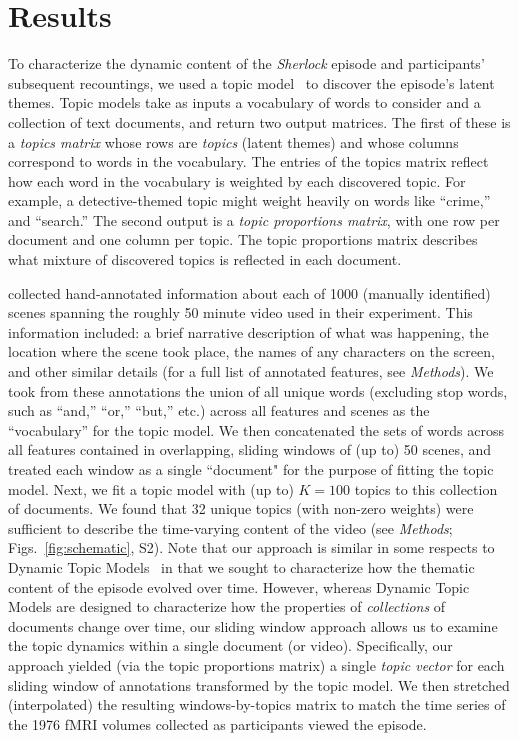 \documentclass{article}
\newcommand{\topics}{S2}
\begin{document}
\section*{Results}
To characterize the dynamic content of the \textit{Sherlock} episode and participants' subsequent recountings, we used a topic model~\citep{BleiEtal03} to discover the episode's latent themes.  Topic models take as inputs a vocabulary of words to consider and a collection of text documents, and return two output matrices.  The first of these is a \textit{topics matrix} whose rows are \textit{topics} (latent themes) and whose columns correspond to words in the vocabulary. The entries of the topics matrix reflect how each word in the vocabulary is weighted by each discovered topic.  For example, a detective-themed topic might weight heavily on words like ``crime,'' and ``search.''  The second output is a \textit{topic proportions matrix}, with one row per document and one column per topic.  The topic proportions matrix describes what mixture of discovered topics is reflected in each document.

\cite{ChenEtal17} collected hand-annotated information about each of 1000 (manually identified) scenes spanning the roughly 50 minute video used in their experiment.  This information included: a brief narrative description of what was happening, the location where the scene took place, the names of any characters on the screen, and other similar details (for a full list of annotated features, see \textit{Methods}).  We took from these annotations the union of all unique words (excluding stop words, such as ``and,'' ``or,'' ``but,'' etc.) across all features and scenes as the ``vocabulary'' for the topic model.  We then concatenated the sets of words across all features contained in overlapping, sliding windows of (up to) 50 scenes, and treated each window as a single ``document" for the purpose of fitting the topic model.  Next, we fit a topic model with (up to) $K = 100$ topics to this collection of documents.  We found that 32 unique topics (with non-zero weights) were sufficient to describe the time-varying content of the video (see \textit{Methods}; Figs.~\ref{fig:schematic}, \topics).  Note that our approach is similar in some respects to Dynamic Topic Models~\citep{BleiLaff06} in that we sought to characterize how the thematic content of the episode evolved over time.  However, whereas Dynamic Topic Models are designed to characterize how the properties of \textit{collections} of documents change over time, our sliding window approach allows us to examine the topic dynamics within a single document (or video).  Specifically, our approach yielded (via the topic proportions matrix) a single \textit{topic vector} for each sliding window of annotations transformed by the topic model.  We then stretched (interpolated) the resulting windows-by-topics matrix to match the time series of the 1976 fMRI volumes collected as participants viewed the episode.
\end{document}
